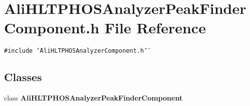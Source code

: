 \section{Ali\-HLTPHOSAnalyzer\-Peak\-Finder\-Component.h File Reference}
\label{AliHLTPHOSAnalyzerPeakFinderComponent_8h}
{\tt \#include \char`\"{}Ali\-HLTPHOSAnalyzer\-Component.h\char`\"{}}\par
\subsection*{Classes}
\begin{CompactItemize}
\item 
class {\bf Ali\-HLTPHOSAnalyzer\-Peak\-Finder\-Component}
\end{CompactItemize}
